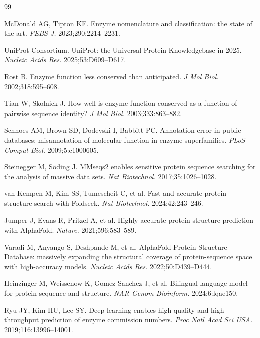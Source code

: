 \documentclass[11pt]{article}
\begin{document}
\small
\begin{thebibliography}{99}
\setlength{\itemsep}{1pt}

McDonald AG, Tipton KF. Enzyme nomenclature and classification: the state of the art. \emph{FEBS J.}
2023;290:2214--2231.

UniProt Consortium. UniProt: the Universal Protein Knowledgebase in 2025. \emph{Nucleic Acids Res.}
2025;53:D609--D617.

Rost B. Enzyme function less conserved than anticipated. \emph{J Mol Biol.} 2002;318:595--608.

Tian W, Skolnick J. How well is enzyme function conserved as a function of pairwise sequence identity? \emph{J Mol
Biol.} 2003;333:863--882.

Schnoes AM, Brown SD, Dodevski I, Babbitt PC. Annotation error in public databases: misannotation of molecular
function in enzyme superfamilies. \emph{PLoS Comput Biol.} 2009;5:e1000605.

Steinegger M, S\"oding J. MMseqs2 enables sensitive protein sequence searching for the analysis of massive data sets.
\emph{Nat Biotechnol.} 2017;35:1026--1028.

van Kempen M, Kim SS, Tumescheit C, et al. Fast and accurate protein structure search with Foldseek. \emph{Nat
Biotechnol.} 2024;42:243--246.

Jumper J, Evans R, Pritzel A, et al. Highly accurate protein structure prediction with AlphaFold. \emph{Nature.}
2021;596:583--589.

Varadi M, Anyango S, Deshpande M, et al. AlphaFold Protein Structure Database: massively expanding the structural
coverage of protein-sequence space with high-accuracy models. \emph{Nucleic Acids Res.} 2022;50:D439--D444.

Heinzinger M, Weissenow K, Gomez Sanchez J, et al. Bilingual language model for protein sequence and structure.
\emph{NAR Genom Bioinform.} 2024;6:lqae150.

Ryu JY, Kim HU, Lee SY. Deep learning enables high-quality and high-throughput prediction of enzyme commission
numbers. \emph{Proc Natl Acad Sci USA.} 2019;116:13996--14001.


\end{thebibliography}
\end{document}

